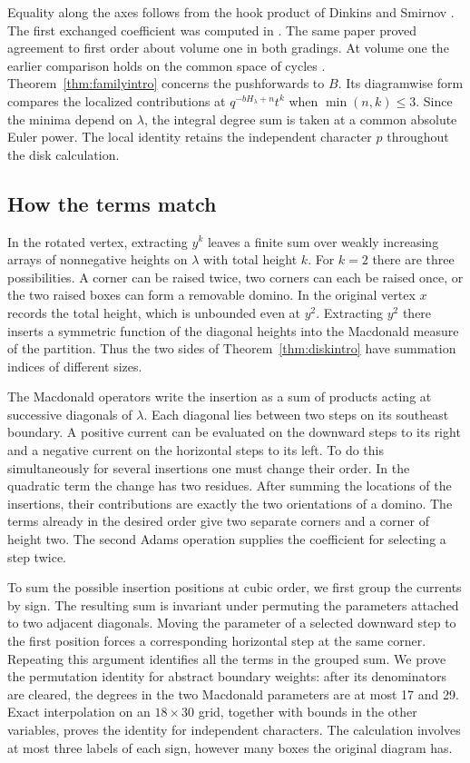 Equality along the axes follows from the hook product of Dinkins and Smirnov \cite{DS}. The first exchanged coefficient was computed in \cite[Theorem~1.2 and \S6]{W1}. The same paper proved agreement to first order about volume one in both gradings. At volume one the earlier comparison holds on the common space of cycles \cite[Theorem~1.1]{W0}. Theorem~\ref{thm:familyintro} concerns the pushforwards to $B$. Its diagramwise form compares the localized contributions at $q^{-bH_\lambda+n}t^k$ when $\min(n,k)\le3$. Since the minima depend on $\lambda$, the integral degree sum is taken at a common absolute Euler power. The local identity retains the independent character $p$ throughout the disk calculation.

\subsection{How the terms match}
In the rotated vertex, extracting $y^k$ leaves a finite sum over weakly increasing arrays of nonnegative heights on $\lambda$ with total height $k$. For $k=2$ there are three possibilities. A corner can be raised twice, two corners can each be raised once, or the two raised boxes can form a removable domino. In the original vertex $x$ records the total height, which is unbounded even at $y^2$. Extracting $y^2$ there inserts a symmetric function of the diagonal heights into the Macdonald measure of the partition. Thus the two sides of Theorem~\ref{thm:diskintro} have summation indices of different sizes.

The Macdonald operators write the insertion as a sum of products acting at successive diagonals of $\lambda$. Each diagonal lies between two steps on its southeast boundary. A positive current can be evaluated on the downward steps to its right and a negative current on the horizontal steps to its left. To do this simultaneously for several insertions one must change their order. In the quadratic term the change has two residues. After summing the locations of the insertions, their contributions are exactly the two orientations of a domino. The terms already in the desired order give two separate corners and a corner of height two. The second Adams operation supplies the coefficient for selecting a step twice.

To sum the possible insertion positions at cubic order, we first group the currents by sign. The resulting sum is invariant under permuting the parameters attached to two adjacent diagonals. Moving the parameter of a selected downward step to the first position forces a corresponding horizontal step at the same corner. Repeating this argument identifies all the terms in the grouped sum. We prove the permutation identity for abstract boundary weights: after its denominators are cleared, the degrees in the two Macdonald parameters are at most 17 and 29. Exact interpolation on an $18\times 30$ grid, together with bounds in the other variables, proves the identity for independent characters. The calculation involves at most three labels of each sign, however many boxes the original diagram has.

